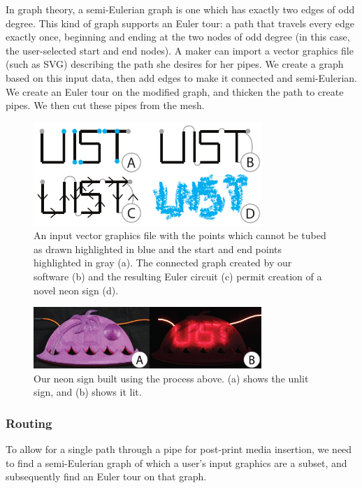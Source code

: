 In graph theory, a semi-Eulerian graph is one which has exactly two edges of odd degree.  This kind of graph supports an Euler tour: a path that travels every edge exactly once, beginning and ending at the two nodes of odd degree (in this case, the user-selected start and end nodes).  A maker can import a vector graphics file (such as SVG) describing the path she desires for her pipes.  We create a graph based on this input data, then add edges to make it connected and semi-Eulerian.  We create an Euler tour on the modified graph, and thicken the path to create pipes.  We then cut these pipes from the mesh.

\begin{figure}[h!]
\centering
    \includegraphics[width=3.4in]{figures/interior.pdf}
\caption{An input vector graphics file with the points which cannot be tubed as drawn highlighted in {\color{blue}blue} and the start and end points highlighted in {\color{gray}gray} (a).  The connected graph created by our software (b) and the resulting Euler circuit (c) permit creation of a novel neon sign (d).}
\label{fig:tool-process-interior}
\end{figure}

\begin{figure}[h!]
\centering
    \includegraphics[width=3.4in]{figures/uistphotos.png}
\caption{Our neon sign built using the process above.  (a) shows the unlit sign, and (b) shows it lit.}
\label{fig:UIST}
\end{figure}

\subsubsection{Routing} 
To allow for a single path through a pipe for post-print media insertion, we need to find a semi-Eulerian graph of which a user's input graphics are a subset, and subsequently find an Euler tour on that graph.

